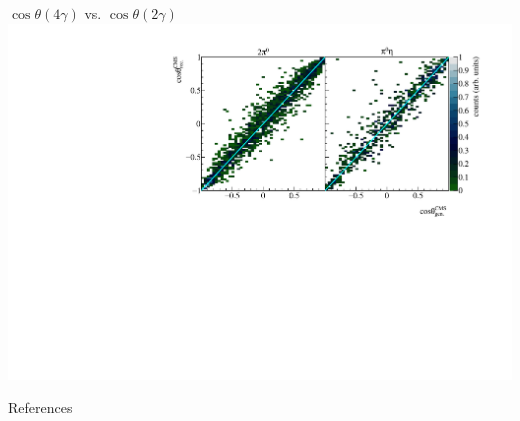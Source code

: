 \documentclass[11pt,aspectratio=169,dvipsnames]{beamer}
\begin{document}
\begin{frame}{$\cos\theta(4\gamma)$ vs. $\cos\theta(2\gamma)$}
	\includegraphics[width=\linewidth]{../../figs/hydrogen/mcgammas_ct.pdf}
\end{frame}
	\begin{frame}[allowframebreaks]{References}
		\printbibliography
		
	\end{frame}
	

	
\end{document}
